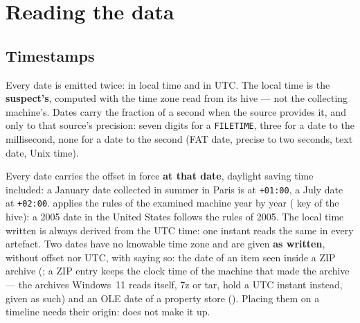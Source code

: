 \documentclass[11pt,a4paper,oneside]{report}
\begin{document}
\chapter{Reading the data}\label{chap:lecture}

\section{Timestamps}

Every date is emitted twice:  in local time and  in UTC.
The local time is the \textbf{suspect's}, computed with the time zone read from
its  hive — not the collecting machine's. Dates carry the
fraction of a second when the source provides it, and only to that source's
precision: seven digits for a \texttt{FILETIME}, three for a date to the
millisecond, none for a date to the second (FAT date, precise to two seconds,
text date, Unix time).

Every date carries the offset in force \textbf{at that date}, daylight saving
time included: a January date collected in summer in Paris is at
\texttt{+01:00}, a July date at \texttt{+02:00}. \wac{} applies the rules of
the examined machine year by year ( key of the
 hive): a 2005 date in the United States follows the rules
of 2005. The local time written is always derived from the UTC time: one instant
reads the same in every artefact. Two dates have no knowable time zone and
are given \textbf{as written}, without offset nor UTC, with 
saying so: the date of an item seen inside a ZIP archive
(; a ZIP entry keeps the clock time of the machine
that made the archive — the archives Windows~11 reads itself, 7z or tar,
hold a UTC instant instead, given as such) and an OLE date of a property store
(). Placing them on a timeline needs their origin: \wac{}
does not make it up.
\end{document}
